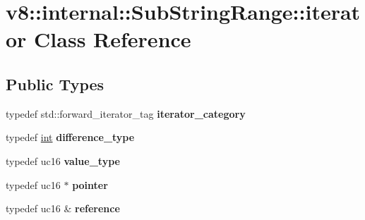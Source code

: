 \hypertarget{classv8_1_1internal_1_1SubStringRange_1_1iterator}{}\section{v8\+:\+:internal\+:\+:Sub\+String\+Range\+:\+:iterator Class Reference}
\label{classv8_1_1internal_1_1SubStringRange_1_1iterator}
\subsection*{Public Types}
\begin{DoxyCompactItemize}
\item 
\mbox{\label{classv8_1_1internal_1_1SubStringRange_1_1iterator_a903ca23e7e40cbe9990c878ac94b2b8a}} 
typedef std\+::forward\+\_\+iterator\+\_\+tag {\bfseries iterator\+\_\+category}
\item 
\mbox{\label{classv8_1_1internal_1_1SubStringRange_1_1iterator_adab23d5c9de1bbf419093dff4279f41d}} 
typedef \mbox{\hyperlink{classint}{int}} {\bfseries difference\+\_\+type}
\item 
\mbox{\label{classv8_1_1internal_1_1SubStringRange_1_1iterator_ac9875513451d8e35089ab0ab24dbbcd0}} 
typedef uc16 {\bfseries value\+\_\+type}
\item 
\mbox{\label{classv8_1_1internal_1_1SubStringRange_1_1iterator_a9dd8f314a93e30fe57ed1626b5203d61}} 
typedef uc16 $\ast$ {\bfseries pointer}
\item 
\mbox{\label{classv8_1_1internal_1_1SubStringRange_1_1iterator_ae688027cce9dc0946f7f433c72fc3c94}} 
typedef uc16 \& {\bfseries reference}
\end{DoxyCompactItemize}

